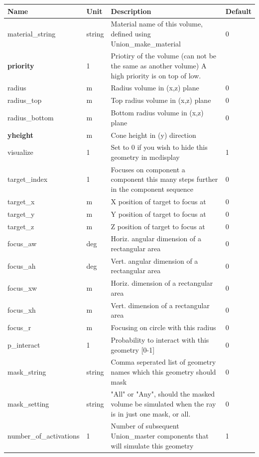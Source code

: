 \begin{longtable}{p{}p{}p{}p{}}
\toprule
\textbf{Name} & \textbf{Unit} & \textbf{Description} & \textbf{Default} \\
\midrule
\endhead
material\_string & string & Material name of this volume, defined using Union\_make\_material & 0 \\
\textbf{priority} & 1 & Priotiry of the volume (can not be the same as another volume) A high priority is on top of low. &  \\
radius & m & Radius volume in (x,z) plane & 0 \\
radius\_top & m & Top radius volume in (x,z) plane & 0 \\
radius\_bottom & m & Bottom radius volume in (x,z) plane & 0 \\
\textbf{yheight} & m & Cone height in (y) direction &  \\
visualize & 1 & Set to 0 if you wish to hide this geometry in mcdisplay & 1 \\
target\_index & 1 & Focuses on component a component this many steps further in the component sequence & 0 \\
target\_x & m & X position of target to focus at & 0 \\
target\_y & m & Y position of target to focus at & 0 \\
target\_z & m & Z position of target to focus at & 0 \\
focus\_aw & deg & Horiz. angular dimension of a rectangular area & 0 \\
focus\_ah & deg & Vert. angular dimension of a rectangular area & 0 \\
focus\_xw & m & Horiz. dimension of a rectangular area & 0 \\
focus\_xh & m & Vert. dimension of a rectangular area & 0 \\
focus\_r & m & Focusing on circle with this radius & 0 \\
p\_interact & 1 & Probability to interact with this geometry [0-1] & 0 \\
mask\_string & string & Comma seperated list of geometry names which this geometry should mask & 0 \\
mask\_setting & string & "All" or "Any", should the masked volume be simulated when the ray is in just one mask, or all. & 0 \\
number\_of\_activations & 1 & Number of subsequent Union\_master components that will simulate this geometry & 1 \\

\end{longtable}
